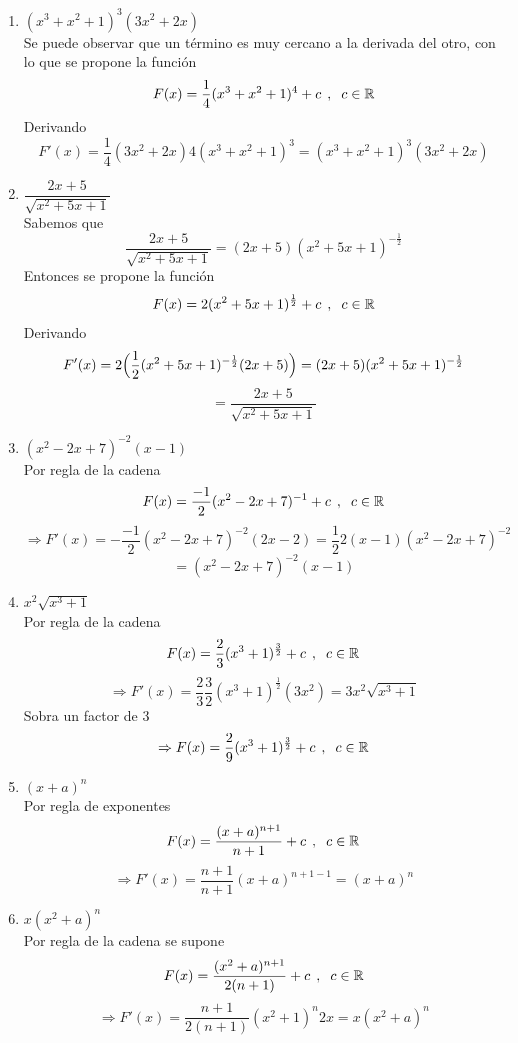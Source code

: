 \documentclass[12pt]{article}
\newcommand{\R}{\ensuremath{\mathbb{R}}}
\begin{document}
\begin{enumerate}
\begin{enumerate}
			\[F(x)=\dfrac{-3}{2(x^2+1)}+c \hspace{0.15cm},\hspace{0.20cm} c\in\R\]
			Lo cual, al derivarse:
			\[F'(x)=-\frac{3}{2}\Bigl(\dfrac{-1}{(x^2+1)^2}\Bigr)2x=\dfrac{3x}{(x^2+1)^2}\]
			\item$(x^3+x^2+1)^3(3x^2+2x)$\\
			Se puede observar que un término es muy cercano a la derivada del otro, con lo que se propone la función
			\[F(x)=\frac{1}{4}(x^3+x^2+1)^4+c \hspace{0.15cm},\hspace{0.20cm} c\in\R\]
			Derivando
			\[F'(x)=\frac{1}{4}(3x^2+2x)4(x^3+x^2+1)^3=(x^3+x^2+1)^3(3x^2+2x)\]
			\item$\dfrac{2x+5}{\sqrt{x^2+5x+1}}$\\
			Sabemos que
			\[\dfrac{2x+5}{\sqrt{x^2+5x+1}}=(2x+5)(x^2+5x+1)^{-\frac{1}{2}}\]
			Entonces se propone la función
			\[F(x)=2(x^2+5x+1)^\frac{1}{2}+c \hspace{0.15cm},\hspace{0.20cm} c\in\R\]
			Derivando
			\[F'(x)=2\Bigl(\frac{1}{2}(x^2+5x+1)^{-\frac{1}{2}}(2x+5)\Bigr)=(2x+5)(x^2+5x+1)^{-\frac{1}{2}}\]
			\[=\dfrac{2x+5}{\sqrt{x^2+5x+1}}\]
			\item$(x^2-2x+7)^{-2}(x-1)$\\
			Por regla de la cadena
			\[F(x)=\frac{-1}{2}(x^2-2x+7)^{-1}+c \hspace{0.15cm},\hspace{0.20cm} c\in\R\]
			\[\Rightarrow F'(x)=-\frac{-1}{2}(x^2-2x+7)^{-2}(2x-2)=\frac{1}{2}2(x-1)(x^2-2x+7)^{-2}\]
			\[=(x^2-2x+7)^{-2}(x-1)\]
			\item$x^2\sqrt{x^3+1}$\\
			Por regla de la cadena
			\[F(x)=\frac{2}{3}(x^3+1)^{\frac{3}{2}}+c \hspace{0.15cm},\hspace{0.20cm} c\in\R\]
			\[\Rightarrow F'(x)=\frac{2}{3}\frac{3}{2}(x^3+1)^{\frac{1}{2}}(3x^2)=3x^2\sqrt{x^3+1}\]
			Sobra un factor de 3
			\[\Rightarrow F(x)=\frac{2}{9}(x^3+1)^{\frac{3}{2}}+c \hspace{0.15cm},\hspace{0.20cm} c\in\R\]
			\item$(x+a)^n$\\
			Por regla de exponentes
			\[F(x)=\dfrac{(x+a)^{n+1}}{n+1}+c \hspace{0.15cm},\hspace{0.20cm} c\in\R\]
			\[\Rightarrow F'(x)=\dfrac{n+1}{n+1}(x+a)^{n+1-1}=(x+a)^n\]
			\item$x(x^2+a)^n$\\
			Por regla de la cadena se supone
			\[F(x)=\dfrac{(x^2+a)^{n+1}}{2(n+1)}+c \hspace{0.15cm},\hspace{0.20cm} c\in\R\]
			\[\Rightarrow F'(x)=\dfrac{n+1}{2(n+1)}(x^2+1)^n2x=x(x^2+a)^n \]
		\end{enumerate}						
	\end{enumerate}
	
\end{document}
